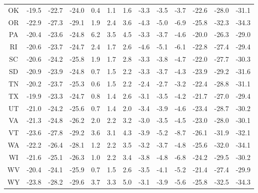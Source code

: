 \begin{table}
\begin{tabular}{ccccccccccccc}
   OK & -19.5 & -22.7 & -24.0 &  0.4 &  1.1 &  1.6 & -3.3 & -3.5 &  -3.7 & -22.6 & -28.0 & -31.1 \\
   OR & -22.9 & -27.3 & -29.1 &  1.9 &  2.4 &  3.6 & -4.3 & -5.0 &  -6.9 & -25.8 & -32.3 & -34.3 \\
   PA & -20.4 & -23.6 & -24.8 &  6.2 &  3.5 &  4.5 & -3.3 & -3.7 &  -4.6 & -20.0 & -26.3 & -29.0 \\
   RI & -20.6 & -23.7 & -24.7 &  2.4 &  1.7 &  2.6 & -4.6 & -5.1 &  -6.1 & -22.8 & -27.4 & -29.4 \\
   SC & -20.6 & -24.2 & -25.8 &  1.9 &  1.7 &  2.8 & -3.3 & -3.8 &  -4.7 & -22.0 & -27.7 & -30.3 \\
   SD & -20.9 & -23.9 & -24.8 &  0.7 &  1.5 &  2.2 & -3.3 & -3.7 &  -4.3 & -23.9 & -29.2 & -31.6 \\
   TN & -20.2 & -23.7 & -25.3 &  0.6 &  1.5 &  2.2 & -2.4 & -2.7 &  -3.2 & -22.4 & -28.8 & -31.1 \\
   TX & -19.9 & -23.3 & -24.7 &  0.8 &  1.4 &  2.6 & -3.1 & -3.5 &  -4.2 & -21.7 & -27.0 & -29.4 \\
   UT & -21.0 & -24.2 & -25.6 &  0.7 &  1.4 &  2.0 & -3.4 & -3.9 &  -4.6 & -23.4 & -28.7 & -30.2 \\
   VA & -21.3 & -24.8 & -26.2 &  2.0 &  2.2 &  3.2 & -3.0 & -3.5 &  -4.5 & -23.0 & -28.0 & -30.1 \\
   VT & -23.6 & -27.8 & -29.2 &  3.6 &  3.1 &  4.3 & -3.9 & -5.2 &  -8.7 & -26.1 & -31.9 & -32.1 \\
   WA & -22.2 & -26.4 & -28.1 &  1.2 &  2.2 &  3.5 & -3.2 & -3.7 &  -4.8 & -25.6 & -32.0 & -34.1 \\
   WI & -21.6 & -25.1 & -26.3 &  1.0 &  2.2 &  3.4 & -3.8 & -4.8 &  -6.8 & -24.2 & -29.5 & -30.2 \\
   WV & -20.4 & -24.1 & -25.9 &  0.7 &  1.5 &  2.6 & -3.5 & -4.1 &  -5.2 & -21.4 & -27.4 & -29.9 \\
   WY & -23.8 & -28.2 & -29.6 &  3.7 &  3.3 &  5.0 & -3.1 & -3.9 &  -5.6 & -25.8 & -32.5 & -34.3 \\
\bottomrule
\end{tabular}
\end{table}

